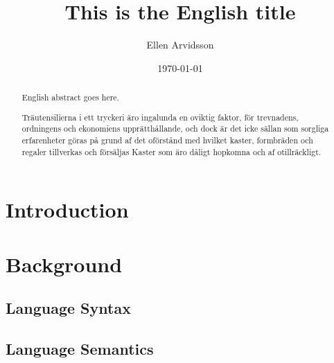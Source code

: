 \documentclass{kththesis}
\title{This is the English title}
\author{Ellen Arvidsson}
\date{\today}
\begin{document}
\frontmatter

\titlepage

\begin{abstract}
  English abstract goes here.

  \blindtext
\end{abstract}


\begin{otherlanguage}{swedish}
  \begin{abstract}
    Träutensilierna i ett tryckeri äro ingalunda en oviktig faktor,
    för trevnadens, ordningens och ekonomiens upprätthållande, och
    dock är det icke sällan som sorgliga erfarenheter göras på grund
    af det oförstånd med hvilket kaster, formbräden och regaler
    tillverkas och försäljas Kaster som äro dåligt hopkomna och af
    otillräckligt.
  \end{abstract}
\end{otherlanguage}


\tableofcontents


\mainmatter


\chapter{Introduction}
\label{cha:introduction}


\chapter{Background}
\label{cha:background}

\section{Language Syntax}
\label{sec:language_syntax}


\section{Language Semantics}
\label{sec:language_semantics}
\end{document}
